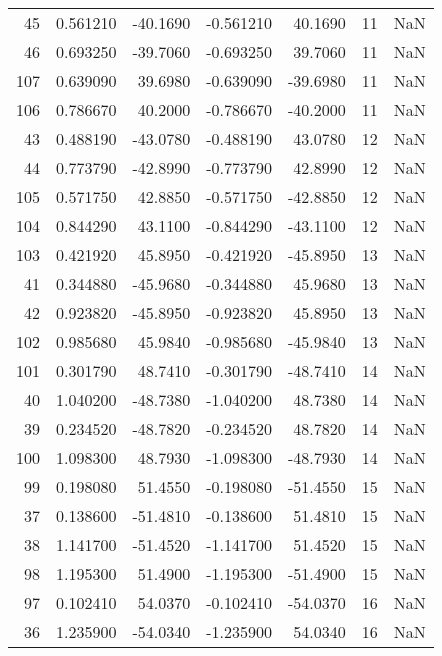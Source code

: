 \begin{tabular}{rrrrrrr}
 45 &   0.561210 &  -40.1690 &  -0.561210 &     40.1690 &          11 & NaN \\
 46 &   0.693250 &  -39.7060 &  -0.693250 &     39.7060 &          11 & NaN \\
107 &   0.639090 &   39.6980 &  -0.639090 &    -39.6980 &          11 & NaN \\
106 &   0.786670 &   40.2000 &  -0.786670 &    -40.2000 &          11 & NaN \\
 43 &   0.488190 &  -43.0780 &  -0.488190 &     43.0780 &          12 & NaN \\
 44 &   0.773790 &  -42.8990 &  -0.773790 &     42.8990 &          12 & NaN \\
105 &   0.571750 &   42.8850 &  -0.571750 &    -42.8850 &          12 & NaN \\
104 &   0.844290 &   43.1100 &  -0.844290 &    -43.1100 &          12 & NaN \\
103 &   0.421920 &   45.8950 &  -0.421920 &    -45.8950 &          13 & NaN \\
 41 &   0.344880 &  -45.9680 &  -0.344880 &     45.9680 &          13 & NaN \\
 42 &   0.923820 &  -45.8950 &  -0.923820 &     45.8950 &          13 & NaN \\
102 &   0.985680 &   45.9840 &  -0.985680 &    -45.9840 &          13 & NaN \\
101 &   0.301790 &   48.7410 &  -0.301790 &    -48.7410 &          14 & NaN \\
 40 &   1.040200 &  -48.7380 &  -1.040200 &     48.7380 &          14 & NaN \\
 39 &   0.234520 &  -48.7820 &  -0.234520 &     48.7820 &          14 & NaN \\
100 &   1.098300 &   48.7930 &  -1.098300 &    -48.7930 &          14 & NaN \\
 99 &   0.198080 &   51.4550 &  -0.198080 &    -51.4550 &          15 & NaN \\
 37 &   0.138600 &  -51.4810 &  -0.138600 &     51.4810 &          15 & NaN \\
 38 &   1.141700 &  -51.4520 &  -1.141700 &     51.4520 &          15 & NaN \\
 98 &   1.195300 &   51.4900 &  -1.195300 &    -51.4900 &          15 & NaN \\
 97 &   0.102410 &   54.0370 &  -0.102410 &    -54.0370 &          16 & NaN \\
 36 &   1.235900 &  -54.0340 &  -1.235900 &     54.0340 &          16 & NaN \\

\end{tabular}
